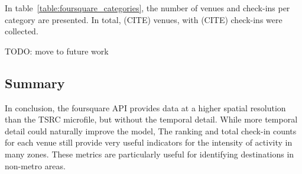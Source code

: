 In table~\ref{table:foursquare_categories}, the number of venues and check-ins per category are presented. In total, (CITE) venues, with (CITE) check-ins were collected.



TODO: move to future work
\subsection{Summary}
In conclusion, the foursquare API provides data at a higher spatial resolution than the TSRC microfile, but without the temporal detail. While more temporal detail could naturally improve the model, The ranking and total check-in counts for each venue still provide very useful indicators for the intensity of activity in many zones. These metrics are particularly useful for identifying destinations in non-metro areas.